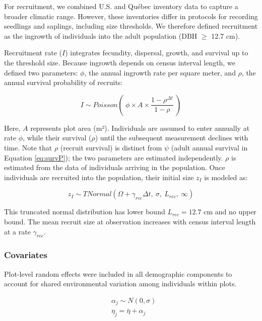 \documentclass[12pt]{article}
\begin{document}
For recruitment, we combined U.S. and Québec inventory data to capture a
broader climatic range. However, these inventories differ in protocols
for recording seedlings and saplings, including size thresholds. We
therefore defined recruitment as the ingrowth of individuals into the
adult population (DBH \(\ge\) 12.7 cm).

Recruitment rate (\(I\)) integrates fecundity, dispersal, growth, and
survival up to the threshold size. Because ingrowth depends on census
interval length, we defined two parameters: \(\phi\), the annual
ingrowth rate per square meter, and \(\rho\), the annual survival
probability of recruits:

\begin{equation}
I \sim Poisson(~\phi \times A \times\frac{1 - \rho^{\Delta t}}{1 - \rho}~)
\label{eq:rec}\end{equation}

Here, \(A\) represents plot area (m²). Individuals are assumed to enter
annually at rate \(\phi\), while their survival (\(\rho\)) until the
subsequent measurement declines with time. Note that \(\rho\) (recruit
survival) is distinct from \(\psi\) (adult annual survival in Equation
\ref{eq:survP}); the two parameters are estimated independently.
\(\rho\) is estimated from the data of individuals arriving in the
population. Once individuals are recruited into the population, their
initial size \(z_I\) is modeled as:

\begin{equation}
z_{I} \sim TNormal(\Omega + \gamma_{rec} \Delta t,~\sigma, ~ L_{rec}, ~ \infty)
\label{eq:recSize}\end{equation}

This truncated normal distribution has lower bound \(L_{rec}=12.7\) cm
and no upper bound. The mean recruit size at observation increases with
census interval length at a rate \(\gamma_{rec}\).

\hypertarget{covariates}{%
\subsubsection{Covariates}\label{covariates}}

Plot-level random effects were included in all demographic components to
account for shared environmental variation among individuals within
plots.

\begin{equation}
\begin{split}
&\alpha_j \sim N(0, \sigma) \\[2pt]
&\eta_j = \bar{\eta} + \alpha_j
\end{split}
\label{eq:randomEffect}\end{equation}
\end{document}
